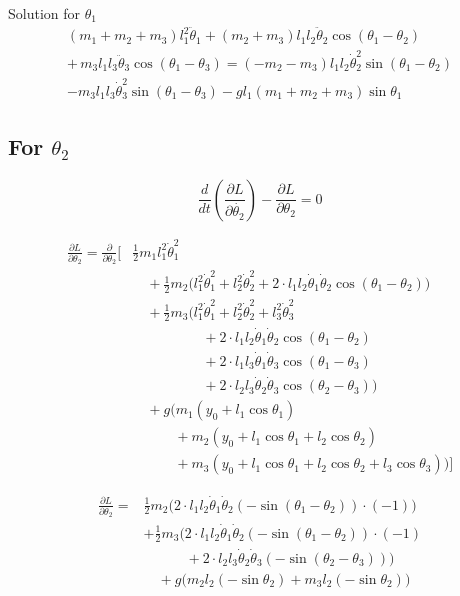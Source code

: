 \documentclass[11pt,a4paper]{article}
\begin{document}
Solution for $\theta_1$
\begin{align*}
    (m_1 + m_2 + m_3) l_1^2 \ddot{\theta}_1 + (m_2 + m_3) l_1 l_2 \ddot{\theta}_2 \cos(\theta_1 - \theta_2) \\
     + \,  m_3 l_1 l_3 \ddot{\theta}_3 \cos(\theta_1 - \theta_3) = (-m_2 - m_3) l_1 l_2 \dot{\theta}_2^2 \sin(\theta_1 - \theta_2) \\
     - m_3 l_1 l_3 \dot{\theta}_3^2 \sin(\theta_1 - \theta_3) - g l_1 (m_1 + m_2 + m_3) \sin\theta_1
\end{align*}

\subsection{For $\theta_2$}

\[ \frac{d}{dt} \left( \frac{\partial L}{\partial \dot{\theta_2}} \right) - \frac{\partial L}{\partial \theta_2} = 0 \]

\begin{align*}
    \frac{\partial L}{\partial \theta_2} = \frac{\partial}{\partial \theta_2} \Biggl[
    &\frac{1}{2} m_1 l_1^2 \dot{\theta}_1^2 \\
    &\quad + \frac{1}{2} m_2 \big( l_1^2 \dot{\theta}_1^2 + l_2^2 \dot{\theta}_2^2 + 2 \cdot l_1 l_2 \dot{\theta}_1 \dot{\theta}_2 \cos(\theta_1 - \theta_2) \big) \\
    &\quad + \frac{1}{2} m_3 \big( l_1^2 \dot{\theta}_1^2 + l_2^2 \dot{\theta}_2^2 + l_3^2 \dot{\theta}_3^2 \\
        &\qquad\qquad\quad + 2 \cdot l_1 l_2 \dot{\theta}_1 \dot{\theta}_2 \cos(\theta_1 - \theta_2) \\
        &\qquad\qquad\quad + 2 \cdot l_1 l_3 \dot{\theta}_1 \dot{\theta}_3 \cos(\theta_1 - \theta_3) \\
        &\qquad\qquad\quad + 2 \cdot l_2 l_3 \dot{\theta}_2 \dot{\theta}_3 \cos(\theta_2 - \theta_3) \big) \\
    &\quad + g \big( m_1 (y_0 + l_1 \cos\theta_1) \\
        &\qquad\quad + m_2 (y_0 + l_1 \cos\theta_1 + l_2 \cos\theta_2) \\
        &\qquad\quad + m_3 (y_0 + l_1 \cos\theta_1 + l_2 \cos\theta_2 + l_3 \cos\theta_3) \big) \Biggr]
\end{align*}

\begin{align*}
    \frac{\partial L}{\partial \theta_2} = 
    &\frac{1}{2} m_2 \Big(2 \cdot l_1 l_2 \dot{\theta}_1 \dot{\theta}_2 (-\sin(\theta_1 - \theta_2)) \cdot (-1) \Big) \\
    &+ \frac{1}{2} m_3 \Big(2 \cdot l_1 l_2 \dot{\theta}_1 \dot{\theta}_2 (-\sin(\theta_1 - \theta_2)) \cdot (-1) \\
        &\qquad\quad + 2 \cdot l_2 l_3 \dot{\theta}_2 \dot{\theta}_3 (-\sin(\theta_2 - \theta_3)) \Big) \\
    &\quad + g \Big( m_2 l_2 (-\sin\theta_2) + m_3 l_2 (-\sin\theta_2) \Big) 
\end{align*}
\end{document}
